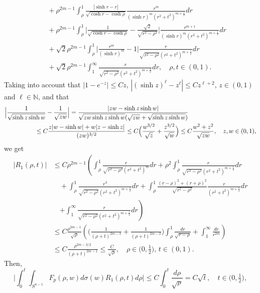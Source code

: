 \documentclass[a4paper,10pt, reqno]{amsart}
\theoremstyle{definition}
\theoremstyle{remark}
\numberwithin{equation}{section}
\begin{document}
{\begin{align*}
    &\quad +\rho ^{2m-1}\int_\rho ^1\frac{|\sinh r-r|}{\sqrt{\cosh r -\cosh \rho}}\frac{r^m}{(\sinh r)^m(r^2+t^2)^{m+\frac{1}{2}}}dr\\
    &\quad +\rho ^{2m-1}\int_\rho ^1\Big|\frac{1}{\sqrt{\cosh r -\cosh \rho}}-\frac{\sqrt{2}}{\sqrt{r^2-\rho ^2}}\Big|\frac{r^{m+1}}{(\sinh r)^m(r^2+t^2)^{m+\frac{1}{2}}}dr\\
    &\quad +\sqrt{2}\rho ^{2m-1}\int_\rho ^1\Big|\frac{r^m}{(\sinh r)^m}-1{}\Big|\frac{r}{\sqrt{r^2-\rho ^2}(r^2+t^2)^{m+\frac{1}{2}}}dr\\
    &\quad +\sqrt{2}\rho ^{2m-1}\int_1^\infty \frac{r}{\sqrt{r^2-\rho ^2}(r^2+t^2)^{m+\frac{1}{2}}}dr,\quad \rho,t\in (0,1).
\end{align*}
Taking into account that $|1-e^{-z}|\leq Cz$, $|(\sinh z)^\ell -z^\ell |\leq Cz^{\ell +2}$, $z\in (0,1)$ and $\ell \in \mathbb N$, and that
\begin{align*}
\Big|\frac{1}{\sqrt{\sinh z \sinh w}}-\frac{1}{\sqrt{zw}}\Big|&=\frac{|zw-\sinh z\sinh w|}{\sqrt{zw\sinh z\sinh w}(\sqrt{zw}+\sqrt{\sinh z\sinh w})}\\
&\hspace{-2cm}\leq C\frac{z|w-\sinh w|+w|z-\sinh z|}{(zw)^{3/2}}\leq C\Big(\frac{w^{3/2}}{\sqrt{z}}+\frac{z^{3/2}}{\sqrt{w}}\Big)\leq C\frac{w^2+z^2}{\sqrt{zw}},\quad z,w\in (0,1),
\end{align*}
we get
\begin{align}\label{cotaK1}
    |R_1(\rho ,t)|&\leq C\rho ^{2m-1}\left(\int_\rho ^1\frac{r}{\sqrt{r^2-\rho ^2}(r^2+t^2)^m}dr+\rho ^2\int_\rho ^1\frac{r}{\sqrt{r^2-\rho ^2}(r^2+t^2)^{m+\frac{1}{2}}}dr\right.\nonumber\\
    &\quad +\int_\rho ^1\frac{r^3}{\sqrt{r^2-\rho ^2}(r^2+t^2)^{m+\frac{1}{2}}}dr+\int_\rho ^1\frac{(r-\rho)^2+(r+\rho)^2}{\sqrt{r^2-\rho^2}}\frac{r}{(r^2+t^2)^{m+\frac{1}{2}}}dr\nonumber\\
    &\quad \left.+\int_1^\infty \frac{r}{\sqrt{r^2-\rho ^2}(r^2+t^2)^{m+\frac{1}{2}}}dr\right)\nonumber\\
    &\leq C\frac{\rho ^{2m-1}}{\sqrt{\rho }}\left(\Big(\frac{1}{(\rho +t)^{2m-1}}+\frac{1}{(\rho +t)^{2m-2}}\Big)\int_\rho ^1\frac{dr}{\sqrt{r-\rho}}+\int_1^\infty \frac{dr}{r^{2m}}\right)\nonumber\\
    &\leq C\frac{\rho ^{2m-3/2}}{(\rho +t)^{2m-1}}\leq \frac{C}{\sqrt{\rho }},\quad \rho\in \big(0,\tfrac{1}{2}\big),\,t\in (0,1).
\end{align}
Then, 
$$
\Big|\int_0^t\int_{S^{n-1}}F_p(\rho ,w)d\sigma (w)R_1(\rho ,t)d\rho\Big|\leq C\int_0^t\frac{d\rho}{\sqrt{\rho }}=C\sqrt{t},\quad t\in \big(0,\tfrac{1}{2}\big),
$$}
\end{document}
